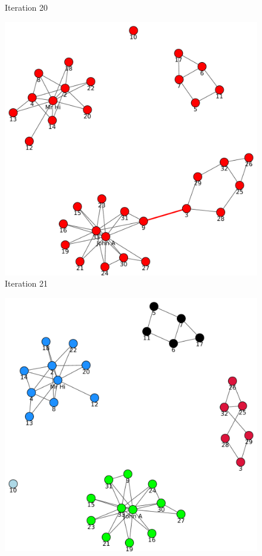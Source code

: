 \begin{itemize}
\begin{figure}[h!]
\begin{center}
\caption{Iteration 20}
\label{fig:q2fig11}
\end{center}
\end{figure}
\newpage
\begin{figure}[h!]
\begin{center}
\includegraphics[scale=0.55, keepaspectratio=true]{figures/graphs/EdgeHighlightedGraph21.pdf}
\caption{Iteration 21}
\label{fig:q2fig12}
\end{center}
\end{figure}
\newpage
\begin{figure}[h!]
\begin{center}
\includegraphics[scale=0.55, keepaspectratio=true]{figures/graphs/GraphWith5Groups.pdf}

\end{center}
\end{figure}
\end{itemize}
